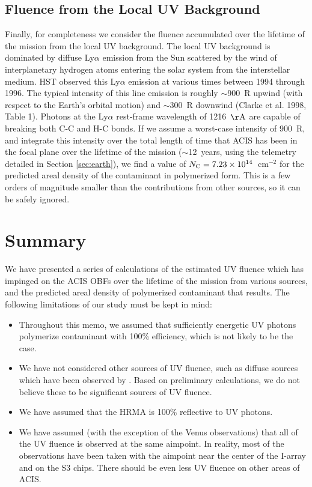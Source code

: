 \documentclass[11pt]{article}
\begin{document}
\subsection{Fluence from the Local UV Background}\label{sec:uv_bkgnd}

Finally, for completeness we consider the fluence accumulated over the lifetime of the mission from the local UV background.
The local UV background is dominated by diffuse Ly$\alpha$ emission from the Sun scattered by the wind of interplanetary
hydrogen atoms entering the solar system from the interstellar medium. HST observed this Ly$\alpha$ emission at various times
between 1994 through 1996. The typical intensity of this line emission is roughly $\sim$900~R upwind (with respect to the Earth's
orbital motion) and $\sim$300~R downwind (Clarke et al. 1998, Table 1). Photons at the Ly$\alpha$ rest-frame wavelength of
1216~$\rm{\AA}$ are capable of breaking both C-C and H-C bonds. If we assume a worst-case intensity of 900~R, and integrate this
intensity over the total length of time that ACIS has been in the focal plane over the lifetime of the mission ($\sim$12~years,
using the telemetry detailed in Section \ref{sec:earth}), we find a value of $N_{\rm C} = 7.23 \times 10^{14}$~cm$^{-2}$ for the
predicted areal density of the contaminant in polymerized form. This is a few orders of magnitude smaller than the contributions
from other sources, so it can be safely ignored. 

\section{Summary}

We have presented a series of calculations of the estimated UV fluence which has impinged on the ACIS OBFs
over the lifetime of the mission from various sources, and the predicted areal density of polymerized contaminant
that results. The following limitations of our study must be kept in mind:

\begin{itemize}
\item Throughout this memo, we assumed that sufficiently energetic UV photons polymerize contaminant with 100\%
efficiency, which is not likely to be the case.
\item We have not considered other sources of UV fluence, such as diffuse sources which have been observed by
\chandra. Based on preliminary calculations, we do not believe these to be significant sources of UV fluence.
\item We have assumed that the HRMA is 100\% reflective to UV photons.
\item We have assumed (with the exception of the Venus observations) that all of the UV fluence is observed at the
same aimpoint. In reality, most of the observations have been taken with the aimpoint near the center of the I-array and
on the S3 chips. There should be even less UV fluence on other areas of ACIS.
\end{itemize}
\end{document}
